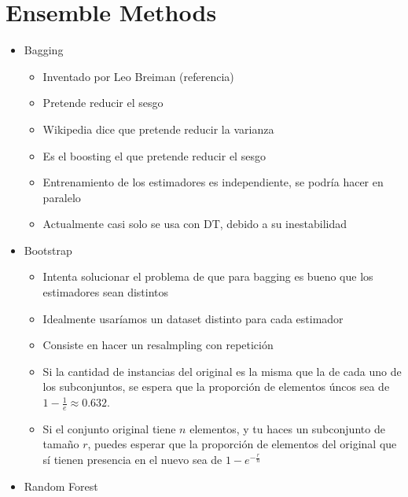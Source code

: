 \section{Ensemble Methods}
    \begin{note}
      \begin{itemize}
        \item Bagging
        \begin{itemize}
          \item Inventado por Leo Breiman (referencia)
          \item Pretende reducir el sesgo
          \item Wikipedia dice que pretende reducir la varianza
          \item Es el boosting el que pretende reducir el sesgo
          \item Entrenamiento de los estimadores es independiente, se podría
          hacer en paralelo
          \item Actualmente casi solo se usa con DT, debido a su inestabilidad
        \end{itemize}
        \item Bootstrap
        \begin{itemize}
          \item Intenta solucionar el problema de que para bagging es bueno
          que los estimadores sean distintos
          \item Idealmente usaríamos un dataset distinto para cada estimador
          \item Consiste en hacer un resalmpling con repetición
          \item Si la cantidad de instancias del original es la misma que la de cada uno
          de los subconjuntos, se espera que la proporción de elementos úncos sea de
          $1 - \frac{1}{e} \approx 0.632$.
          \item Si el conjunto original tiene $n$ elementos, y tu haces un subconjunto
          de tamaño $r$, puedes esperar que la proporción de elementos del original que
          sí tienen presencia en el nuevo sea de $1 - e^{-\frac{r}{n}}$
        \end{itemize}
        \item Random Forest
      \end{itemize}
    \end{note}

